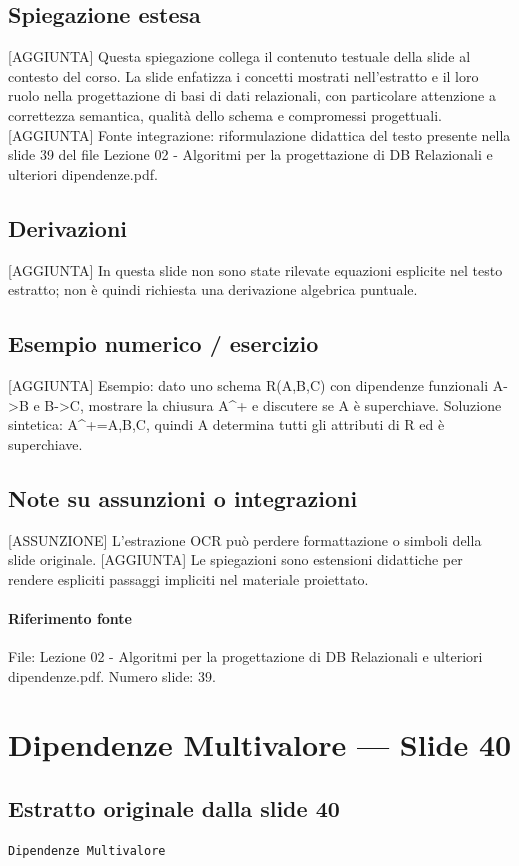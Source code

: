 \documentclass[11pt]{article}
\begin{document}
\subsection*{Spiegazione estesa}
[AGGIUNTA] Questa spiegazione collega il contenuto testuale della slide al contesto del corso. La slide enfatizza i concetti mostrati nell'estratto e il loro ruolo nella progettazione di basi di dati relazionali, con particolare attenzione a correttezza semantica, qualità dello schema e compromessi progettuali.
[AGGIUNTA] Fonte integrazione: riformulazione didattica del testo presente nella slide 39 del file Lezione 02 - Algoritmi per la progettazione di DB Relazionali e ulteriori dipendenze.pdf.
\subsection*{Derivazioni}
[AGGIUNTA] In questa slide non sono state rilevate equazioni esplicite nel testo estratto; non è quindi richiesta una derivazione algebrica puntuale.
\subsection*{Esempio numerico / esercizio}
[AGGIUNTA] Esempio: dato uno schema R(A,B,C) con dipendenze funzionali A->B e B->C, mostrare la chiusura A^+ e discutere se A è superchiave. Soluzione sintetica: A^+={A,B,C}, quindi A determina tutti gli attributi di R ed è superchiave.
\subsection*{Note su assunzioni o integrazioni}
[ASSUNZIONE] L'estrazione OCR può perdere formattazione o simboli della slide originale.
[AGGIUNTA] Le spiegazioni sono estensioni didattiche per rendere espliciti passaggi impliciti nel materiale proiettato.
\paragraph{Riferimento fonte} File: Lezione 02 - Algoritmi per la progettazione di DB Relazionali e ulteriori dipendenze.pdf. Numero slide: 39.
\section{Dipendenze Multivalore --- Slide 40}
\subsection*{Estratto originale dalla slide 40}
\begin{lstlisting}
Dipendenze Multivalore
\end{lstlisting}
\end{document}
